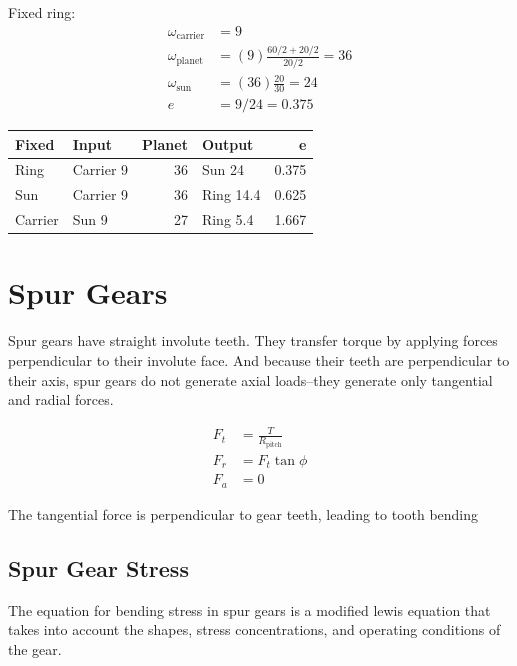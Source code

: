 \documentclass[a4paper,openany]{kaobook}
\begin{document}
Fixed ring:\\

\begin{align*}
  \omega_{\text{carrier}} &= 9 \\
  \omega_{\text{planet}} &= (9) \frac{60/2 + 20/2}{20/2} = 36 \\
  \omega_{\text{sun}} &= (36) \frac{20}{30} = 24 \\
  e &= 9/24 = 0.375
\end{align*}

\begin{center}
\begin{tabular}{llrlr}
\toprule
Fixed & Input & Planet & Output & e\\
\midrule
Ring & Carrier 9 & 36 & Sun 24 & 0.375\\
Sun & Carrier 9 & 36 & Ring 14.4 & 0.625\\
Carrier & Sun 9 & 27 & Ring 5.4 & 1.667\\
\bottomrule
\end{tabular}
\end{center}

\chapter{Spur Gears}
\label{sec:orgaf803a3}

Spur gears have straight involute teeth. They transfer torque by applying forces perpendicular to their involute face. And because their teeth are perpendicular to their axis, spur gears do not generate axial loads--they generate only tangential and radial forces.

\begin{align}
\label{eq: spur gear forces}
  F_{t} &= \frac{T}{R_{\text{pitch}}} \\
  F_{r} &= F_{t} \tan \phi \\
  F_{a} &= 0
\end{align}

The tangential force is perpendicular to gear teeth, leading to tooth bending

\section{Spur Gear Stress}
\label{sec:org1d77a70}

The equation for bending stress in spur gears is a modified lewis equation that takes into account the shapes, stress concentrations, and operating conditions of the gear.
\end{document}
